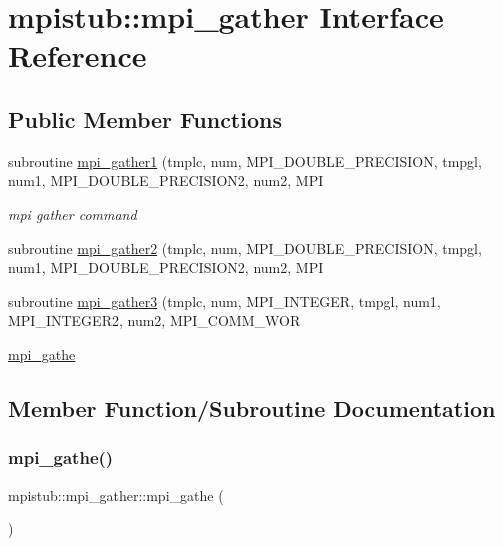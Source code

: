 \hypertarget{interfacempistub_1_1mpi__gather}{}\section{mpistub\+::mpi\+\_\+gather Interface Reference}
\label{interfacempistub_1_1mpi__gather}
\subsection*{Public Member Functions}
\begin{DoxyCompactItemize}
\item 
subroutine \mbox{\hyperlink{interfacempistub_1_1mpi__gather_afd38a0894f5a19c1f36c999b9fbbdfa8}{mpi\+\_\+gather1}} (tmplc, num, M\+P\+I\+\_\+\+D\+O\+U\+B\+L\+E\+\_\+\+P\+R\+E\+C\+I\+S\+I\+ON, tmpgl, num1, M\+P\+I\+\_\+\+D\+O\+U\+B\+L\+E\+\_\+\+P\+R\+E\+C\+I\+S\+I\+O\+N2, num2, M\+PI
\begin{DoxyCompactList}\small\item\em mpi gather command \end{DoxyCompactList}\item 
subroutine \mbox{\hyperlink{interfacempistub_1_1mpi__gather_a402fed9230c95b1b4ed06d004476a818}{mpi\+\_\+gather2}} (tmplc, num, M\+P\+I\+\_\+\+D\+O\+U\+B\+L\+E\+\_\+\+P\+R\+E\+C\+I\+S\+I\+ON, tmpgl, num1, M\+P\+I\+\_\+\+D\+O\+U\+B\+L\+E\+\_\+\+P\+R\+E\+C\+I\+S\+I\+O\+N2, num2, M\+PI
\item 
subroutine \mbox{\hyperlink{interfacempistub_1_1mpi__gather_a7385d7a064fdd5e01d15695311aaa87e}{mpi\+\_\+gather3}} (tmplc, num, M\+P\+I\+\_\+\+I\+N\+T\+E\+G\+ER, tmpgl, num1, M\+P\+I\+\_\+\+I\+N\+T\+E\+G\+E\+R2, num2, M\+P\+I\+\_\+\+C\+O\+M\+M\+\_\+\+W\+OR
\item 
\mbox{\hyperlink{interfacempistub_1_1mpi__gather_a67c862b081463c3a6a916252593a2ba1}{mpi\+\_\+gathe}}
\end{DoxyCompactItemize}


\subsection{Member Function/\+Subroutine Documentation}
\mbox{\label{interfacempistub_1_1mpi__gather_a67c862b081463c3a6a916252593a2ba1}} 
\subsubsection{\texorpdfstring{mpi\_gathe()}{mpi\_gathe()}}
{\footnotesize\ttfamily mpistub\+::mpi\+\_\+gather\+::mpi\+\_\+gathe (\begin{DoxyParamCaption}{ }\end{DoxyParamCaption})}

